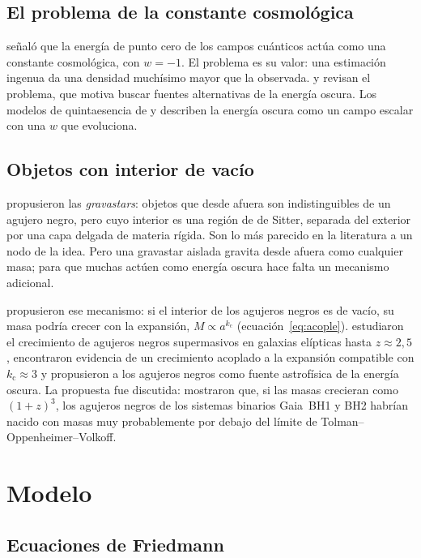 \documentclass[11pt,a4paper]{article}
\begin{document}
\subsection{El problema de la constante cosmológica}

\textcite{zeldovich1968} señaló que la energía de punto cero de los campos cuánticos actúa como una constante cosmológica, con $w = -1$. El problema es su valor: una estimación ingenua da una densidad muchísimo mayor que la observada. \textcite{weinberg1989} y \textcite{carroll2001} revisan el problema, que motiva buscar fuentes alternativas de la energía oscura. Los modelos de quintaesencia de \textcite{ratra1988} y \textcite{caldwell1998} describen la energía oscura como un campo escalar con una $w$ que evoluciona.

\subsection{Objetos con interior de vacío}

\textcite{mazur2004} propusieron las \emph{gravastars}: objetos que desde afuera son indistinguibles de un agujero negro, pero cuyo interior es una región de de Sitter, separada del exterior por una capa delgada de materia rígida. Son lo más parecido en la literatura a un nodo de la idea. Pero una gravastar aislada gravita desde afuera como cualquier masa; para que muchas actúen como energía oscura hace falta un mecanismo adicional.

\textcite{croker2019} propusieron ese mecanismo: si el interior de los agujeros negros es de vacío, su masa podría crecer con la expansión, $M \propto a^{k_{\mathrm c}}$ (ecuación~\eqref{eq:acople}). \textcite{farrah2023} estudiaron el crecimiento de agujeros negros supermasivos en galaxias elípticas hasta $z \approx 2{,}5$, encontraron evidencia de un crecimiento acoplado a la expansión compatible con $k_{\mathrm c} \approx 3$ y propusieron a los agujeros negros como fuente astrofísica de la energía oscura. La propuesta fue discutida: \textcite{andrae2023} mostraron que, si las masas crecieran como $(1+z)^3$, los agujeros negros de los sistemas binarios Gaia~BH1 y BH2 habrían nacido con masas muy probablemente por debajo del límite de Tolman--Oppenheimer--Volkoff.

\section{Modelo}\label{sec:modelo}

\subsection{Ecuaciones de Friedmann}
\end{document}
